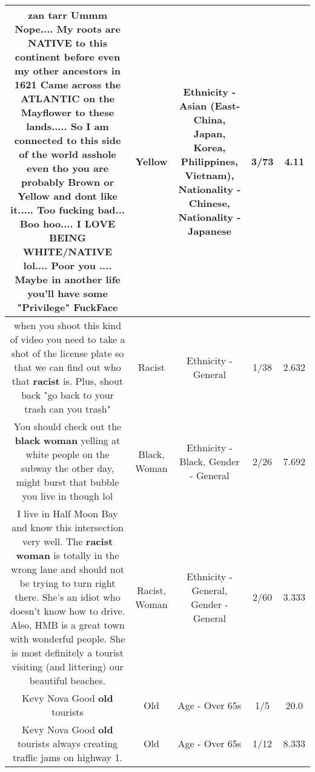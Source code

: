 \documentclass[11pt]{article}
\newlength\mylength
\begin{document}
\begin{center}
\begin{longtable}{|C{.65\mylength}|C{.30\mylength}|C{.12\mylength}|C{.12\mylength}|C{.12\mylength}|}
  \small zan tarr Ummm Nope.... My roots are NATIVE to this continent before even my other ancestors in 1621 Came across the ATLANTIC on the Mayflower to these lands..... So I am connected to this side of the world asshole even tho you are probably Brown or \textbf{Y\textbf{e\textbf{llow}}} and dont like it..... Too fucking bad... Boo hoo.... I LOVE BEING WHITE/NATIVE lol.... Poor you .... Maybe in another life you'll have some "Privilege" FuckFace\normalsize   & Yellow & Ethnicity - Asian (East- China, Japan, Korea, Philippines, Vietnam), Nationality - Chinese, Nationality - Japanese & 3/73 & 4.11 \\  \hline
  \small when you shoot this kind of video you need to take a shot of the license plate so that we can find out who that \textbf{racist} is. Plus, shout back "go back to your trash can you trash"\normalsize   & Racist & Ethnicity - General & 1/38 & 2.632 \\  \hline
  \small You should check out the \textbf{black} \textbf{woman} yelling at white people on the subway the other day, might burst that bubble you live in though lol\normalsize   & Black, Woman & Ethnicity - Black, Gender - General & 2/26 & 7.692 \\  \hline
  \small I live in Half Moon Bay and know this intersection very well. The \textbf{racist} \textbf{woman} is totally in the wrong lane and should not be trying to turn right there. She's an idiot who doesn't know how to drive. Also, HMB is a great town with wonderful people. She is most definitely a tourist visiting (and littering) our beautiful beaches.\normalsize   & Racist, Woman & Ethnicity - General, Gender - General & 2/60 & 3.333 \\  \hline
  \small Kevy Nova Good \textbf{old} tourists\normalsize   & Old & Age - Over 65s & 1/5 & 20.0 \\  \hline
  \small Kevy Nova Good \textbf{old} tourists always creating traffic jams on highway 1.\normalsize   & Old & Age - Over 65s & 1/12 & 8.333 \\  \hline

\end{longtable}
\end{center}
\end{document}

